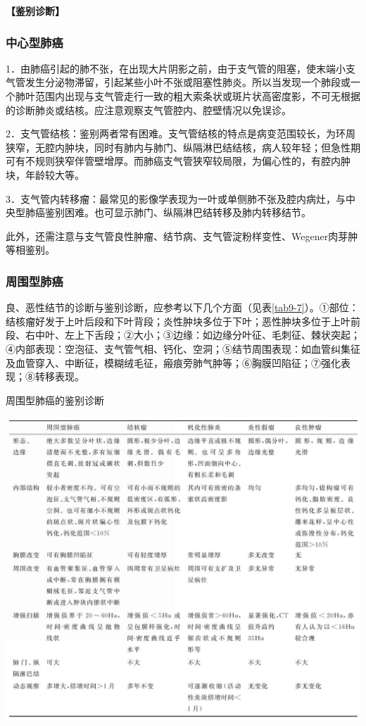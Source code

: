 \textbf{【鉴别诊断】}

\subsubsection{中心型肺癌}

1．由肺癌引起的肺不张，在出现大片阴影之前，由于支气管的阻塞，使末端小支气管发生分泌物滞留，引起某些小叶不张或阻塞性肺炎。所以当发现一个肺段或一个肺叶范围内出现与支气管走行一致的粗大索条状或斑片状高密度影，不可无根据的诊断肺炎或结核。应注意观察支气管腔内、腔壁情况以免误诊。

2．支气管结核：鉴别两者常有困难。支气管结核的特点是病变范围较长，为环周狭窄，无腔内肿块，同时有肺内与肺门、纵隔淋巴结结核，病人较年轻；但急性期可有不规则狭窄伴管壁增厚。而肺癌支气管狭窄较局限，为偏心性的，有腔内肿块，年龄较大等。

3．支气管内转移瘤：最常见的影像学表现为一叶或单侧肺不张及腔内病灶，与中央型肺癌鉴别困难。也可显示肺门、纵隔淋巴结转移及肺内转移结节。

此外，还需注意与支气管良性肿瘤、结节病、支气管淀粉样变性、Wegener肉芽肿等相鉴别。

\subsubsection{周围型肺癌}

良、恶性结节的诊断与鉴别诊断，应参考以下几个方面（见表\ref{tab9-7}）。①部位：结核瘤好发于上叶后段和下叶背段；炎性肿块多位于下叶；恶性肿块多位于上叶前段、右中叶、左上下舌段；②大小；③边缘：如边缘分叶征、毛刺征、棘状突起；④内部表现：空泡征、支气管气相、钙化、空洞；⑤结节周围表现：如血管纠集征及血管穿入、中断征，模糊绒毛征，瘢痕旁肺气肿等；⑥胸膜凹陷征；⑦强化表现；⑧转移表现。

\begin{table}[htbp]
\centering
\caption{周围型肺癌的鉴别诊断}
\label{tab9-7}
\includegraphics[width=\textwidth,height=\textheight,keepaspectratio]{./images/Image00219.jpg}
\end{table}

